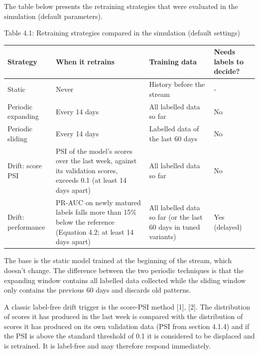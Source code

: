 \documentclass[11pt,letterpaper]{report}
\begin{document}
The table below presents the retraining strategies that were evaluated in the simulation (default parameters).

\begin{center}\small Table 4.1: Retraining strategies compared in the simulation (default settings)\end{center}
\vspace{-1.2em}

{\small
\begin{longtable}{|>{\raggedright\arraybackslash}p{}|>{\raggedright\arraybackslash}p{}|>{\raggedright\arraybackslash}p{}|>{\raggedright\arraybackslash}p{}|}
\hline
Strategy & When it retrains & Training data & Needs labels to decide? \\ \hline
Static & Never & History before the stream & - \\ \hline
Periodic expanding & Every 14 days & All labelled data so far & No \\ \hline
Periodic sliding & Every 14 days & Labelled data of the last 60 days & No \\ \hline
Drift: score PSI & PSI of the model's scores over the last week, against its validation scores, exceeds 0.1 (at least 14 days apart) & All labelled data so far & No \\ \hline
Drift: performance & PR-AUC on newly matured labels falls more than 15\% below the reference (Equation 4.2; at least 14 days apart) & All labelled data so far (or the last 60 days in tuned variants) & Yes (delayed) \\ \hline
\end{longtable}
}

The base is the static model trained at the beginning of the stream, which doesn't change. The difference between the two periodic techniques is that the expanding window contains all labelled data collected while the sliding window only contains the previous 60 days and discards old patterns.

A classic label-free drift trigger is the score-PSI method [1], [2]. The distribution of scores it has produced in the last week is compared with the distribution of scores it has produced on its own validation data (PSI from section 4.1.4) and if the PSI is above the standard threshold of 0.1 it is considered to be displaced and is retrained. It is label-free and may therefore respond immediately.
\end{document}

